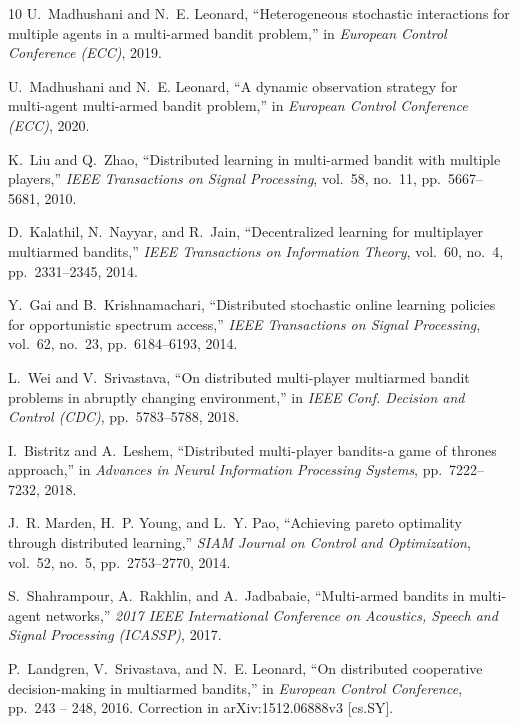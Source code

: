 \documentclass[final,5p,times,twocolumn]{elsarticle}
\theoremstyle{definition}
\begin{document}
\begin{thebibliography}{10}
	U.~Madhushani and N.~E. Leonard, ``Heterogeneous stochastic interactions for
	multiple agents in a multi-armed bandit problem,'' in {\em European Control
		Conference (ECC)}, 2019.
	
	U.~Madhushani and N.~E. Leonard, ``A dynamic observation strategy for \\
	multi-agent multi-armed bandit problem,'' in {\em European Control Conference
		(ECC)}, 2020.
	
	K.~Liu and Q.~Zhao, ``Distributed learning in multi-armed bandit with multiple
	players,'' {\em IEEE Transactions on Signal Processing}, vol.~58, no.~11,
	pp.~5667--5681, 2010.
	
	D.~Kalathil, N.~Nayyar, and R.~Jain, ``Decentralized learning for multiplayer
	multiarmed bandits,'' {\em IEEE Transactions on Information Theory}, vol.~60,
	no.~4, pp.~2331--2345, 2014.
	
	Y.~Gai and B.~Krishnamachari, ``Distributed stochastic online learning policies
	for opportunistic spectrum access,'' {\em IEEE Transactions on Signal
		Processing}, vol.~62, no.~23, pp.~6184--6193, 2014.
	
	L.~Wei and V.~Srivastava, ``On distributed multi-player multiarmed bandit
	problems in abruptly changing environment,'' in {\em IEEE Conf. Decision and
		Control (CDC)}, pp.~5783--5788, 2018.
	
	I.~Bistritz and A.~Leshem, ``Distributed multi-player bandits-a game of thrones
	approach,'' in {\em Advances in Neural Information Processing Systems},
	pp.~7222--7232, 2018.
	
	J.~R. Marden, H.~P. Young, and L.~Y. Pao, ``Achieving pareto optimality through
	distributed learning,'' {\em SIAM Journal on Control and Optimization},
	vol.~52, no.~5, pp.~2753--2770, 2014.
	
	S.~Shahrampour, A.~Rakhlin, and A.~Jadbabaie, ``Multi-armed bandits in
	multi-agent networks,'' {\em 2017 IEEE International Conference on Acoustics,
		Speech and Signal Processing (ICASSP)}, 2017.
	
	P.~Landgren, V.~Srivastava, and N.~E. Leonard, ``On distributed cooperative
	decision-making in multiarmed bandits,'' in {\em European Control
		Conference}, pp.~243 -- 248, 2016.
	\newblock Correction in arXiv:1512.06888v3 [cs.SY].
	

\end{thebibliography}
\end{document}
